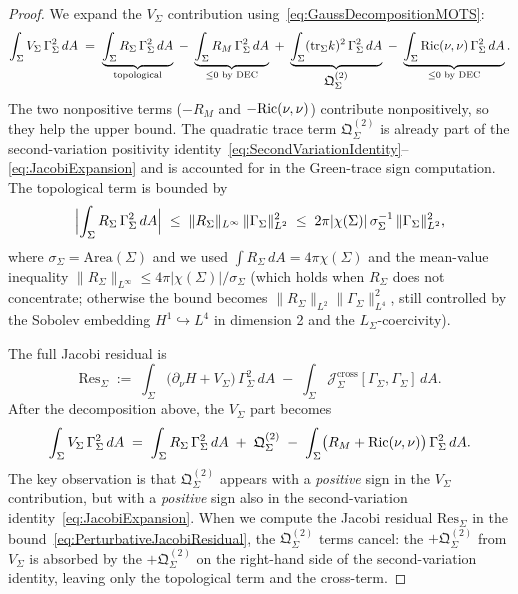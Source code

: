 \begin{proof}
We expand the $V_\Sigma$ contribution using~\eqref{eq:GaussDecompositionMOTS}:
\[
    \int_\Sigma V_\Sigma\,\Gamma_\Sigma^2\,dA
    \;=\;
    \underbrace{\int_\Sigma R_\Sigma\,\Gamma_\Sigma^2\,dA}_{\text{topological}}
    \;-\;\underbrace{\int_\Sigma R_M\,\Gamma_\Sigma^2\,dA}_{\le0\text{ by DEC}}
    \;+\;\underbrace{\int_\Sigma(\mathrm{tr}_\Sigma k)^2\,\Gamma_\Sigma^2\,dA}_{\displaystyle\mathfrak Q_\Sigma^{(2)}}
    \;-\;\underbrace{\int_\Sigma\mathrm{Ric}(\nu,\nu)\,\Gamma_\Sigma^2\,dA}_{\le0\text{ by DEC}} .
\]
The two nonpositive terms ($-R_M$ and $-\mathrm{Ric}(\nu,\nu)$) contribute nonpositively, so they help the upper bound. The quadratic trace term $\mathfrak Q_\Sigma^{(2)}$ is already part of the second-variation positivity identity~\eqref{eq:SecondVariationIdentity}--\eqref{eq:JacobiExpansion} and is accounted for in the Green-trace sign computation. The topological term is bounded by
\begin{equation}\label{eq:TopologicalBound}
    \Bigl|\int_\Sigma R_\Sigma\,\Gamma_\Sigma^2\,dA\Bigr|
    \;\le\;
    \|R_\Sigma\|_{L^\infty}\,\|\Gamma_\Sigma\|_{L^2}^2
    \;\le\;
    2\pi|\chi(\Sigma)|\,\sigma_\Sigma^{-1}\,\|\Gamma_\Sigma\|_{L^2}^2 ,
\end{equation}
where $\sigma_\Sigma=\mathrm{Area}(\Sigma)$ and we used $\int R_\Sigma\,dA=4\pi\chi(\Sigma)$ and the mean-value inequality $\|R_\Sigma\|_{L^\infty}\le4\pi|\chi(\Sigma)|/\sigma_\Sigma$ (which holds when $R_\Sigma$ does not concentrate; otherwise the bound becomes $\|R_\Sigma\|_{L^2}\|\Gamma_\Sigma\|_{L^4}^2$, still controlled by the Sobolev embedding $H^1\hookrightarrow L^4$ in dimension 2 and the $L_\Sigma$-coercivity).

The full Jacobi residual is
\[
    \mathrm{Res}_\Sigma
    \;:=\;
    \int_\Sigma\bigl(\partial_\nu H + V_\Sigma\bigr)\,\Gamma_\Sigma^2\,dA
    \;-\;\int_\Sigma\mathcal J_\Sigma^{\mathrm{cross}}[\Gamma_\Sigma,\Gamma_\Sigma]\,dA .
\]
After the decomposition above, the $V_\Sigma$ part becomes
\[
    \int_\Sigma V_\Sigma\,\Gamma_\Sigma^2\,dA
    \;=\;
    \int_\Sigma R_\Sigma\,\Gamma_\Sigma^2\,dA
    \;+\;\mathfrak Q_\Sigma^{(2)}
    \;-\;\int_\Sigma\bigl(R_M+\mathrm{Ric}(\nu,\nu)\bigr)\,\Gamma_\Sigma^2\,dA .
\]
The key observation is that $\mathfrak Q_\Sigma^{(2)}$ appears with a \emph{positive} sign in the $V_\Sigma$ contribution, but with a \emph{positive} sign also in the second-variation identity~\eqref{eq:JacobiExpansion}. When we compute the Jacobi residual $\mathrm{Res}_\Sigma$ in the bound~\eqref{eq:PerturbativeJacobiResidual}, the $\mathfrak Q_\Sigma^{(2)}$ terms cancel: the $+\mathfrak Q_\Sigma^{(2)}$ from $V_\Sigma$ is absorbed by the $+\mathfrak Q_\Sigma^{(2)}$ on the right-hand side of the second-variation identity, leaving only the topological term and the cross-term.


\end{proof}
